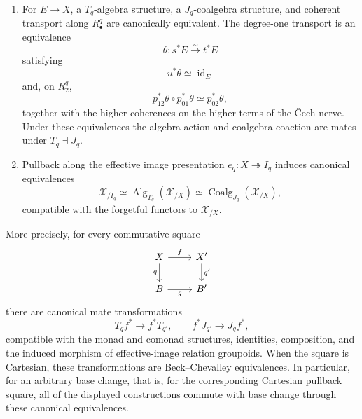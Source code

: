 \begin{theorem}
\begin{enumerate}
\[\begin{aligned}
        &\simeq
        \operatorname{Map}_X(A,J_qE),
    \end{aligned}
    \]
    naturally in $A,E\in\mathcal X_{/X}$.
    \item For $E\to X$, a $T_q$-algebra structure, a $J_q$-coalgebra
    structure, and coherent transport along $R^q_\bullet$ are canonically
    equivalent.  The degree-one transport is an equivalence
    \[
        \theta:s^*E\xrightarrow{\sim}t^*E
    \]
    satisfying
    \[
        u^*\theta\simeq\operatorname{id}_E
    \]
    and, on $R^q_2$,
    \[
        p_{12}^*\theta\circ p_{01}^*\theta
        \simeq
        p_{02}^*\theta,
    \]
    together with the higher coherences on the higher terms of the
    \v{C}ech nerve.  Under these equivalences the algebra action and
    coalgebra coaction are mates under $T_q\dashv J_q$.
    \item Pullback along the effective image presentation
    $e_q:X\twoheadrightarrow I_q$ induces canonical equivalences
    \[
        \mathcal X_{/I_q}
        \simeq
        \operatorname{Alg}_{T_q}(\mathcal X_{/X})
        \simeq
        \operatorname{Coalg}_{J_q}(\mathcal X_{/X}),
    \]
    compatible with the forgetful functors to $\mathcal X_{/X}$.
\end{enumerate}
More precisely, for every commutative square
\[
\begin{tikzcd}
X \arrow[r,"f"] \arrow[d,"q"'] &
X' \arrow[d,"q'"]\\
B \arrow[r,"g"'] &
B'
\end{tikzcd}
\]
there are canonical mate transformations
\[
    T_qf^*\longrightarrow f^*T_{q'},
    \qquad
    f^*J_{q'}\longrightarrow J_qf^*,
\]
compatible with the monad and comonad structures, identities, composition,
and the induced morphism of effective-image relation groupoids.  When the
square is Cartesian, these transformations are Beck--Chevalley
equivalences.  In particular, for an arbitrary base change, that is, for the
corresponding Cartesian pullback square, all of the displayed constructions
commute with base change through these canonical equivalences.
\end{theorem}

